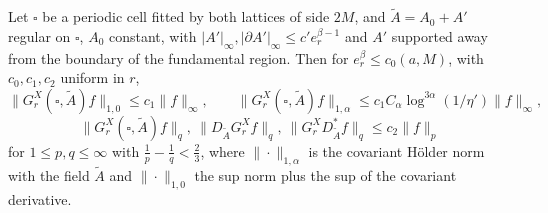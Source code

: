 \begin{lemma}\label{rot:hyb:lem:HOL}
Let $\square$ be a periodic cell fitted by both lattices of side $2M$, and $\tilde A=A_0+A'$ regular on $\square$, $A_0$ constant, with $|A'|_\infty,|\partial A'|_\infty\le c'e_r^{\beta-1}$ and $A'$ supported away from the boundary of the fundamental region. Then for $e_r^\beta\le c_0(a,M)$, with $c_0,c_1,c_2$ uniform in $r$,
\[
\|G^X_r(\square,\tilde A)f\|_{1,0}\le c_1\|f\|_\infty,\qquad\|G^X_r(\square,\tilde A)f\|_{1,\alpha}\le c_1C_\alpha\log^{3\alpha}(1/\eta')\|f\|_\infty,
\]
\[
\|G^X_r(\square,\tilde A)f\|_q,\ \|D_{\tilde A}G^X_rf\|_q,\ \|G^X_rD_{\tilde A}^*f\|_q\le c_2\|f\|_p
\]
for $1\le p,q\le\infty$ with $\frac1p-\frac1q<\frac23$, where $\|\cdot\|_{1,\alpha}$ is the covariant H\"older norm \cite[(2.14)]{Ba4} with the field $\tilde A$ and $\|\cdot\|_{1,0}$ the sup norm plus the sup of the covariant derivative.
\end{lemma}

